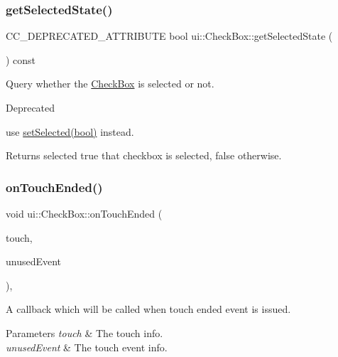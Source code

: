 \subsubsection{\texorpdfstring{get\+Selected\+State()}{getSelectedState()}\hspace{0.1cm}{\footnotesize\ttfamily [2/2]}}
{\footnotesize\ttfamily C\+C\+\_\+\+D\+E\+P\+R\+E\+C\+A\+T\+E\+D\+\_\+\+A\+T\+T\+R\+I\+B\+U\+TE bool ui\+::\+Check\+Box\+::get\+Selected\+State (\begin{DoxyParamCaption}{ }\end{DoxyParamCaption}) const\hspace{0.3cm}{\ttfamily [inline]}}

Query whether the \hyperlink{classui_1_1CheckBox}{Check\+Box} is selected or not.

\begin{DoxyRefDesc}{Deprecated}
\item[\hyperlink{deprecated__deprecated000373}{Deprecated}]use {\ttfamily \hyperlink{classui_1_1AbstractCheckButton_aca6eea451771dd184a1cd02984e77cc6}{set\+Selected(bool)}} instead. \end{DoxyRefDesc}
\begin{DoxyReturn}{Returns}
selected true that checkbox is selected, false otherwise. 
\end{DoxyReturn}
\mbox{\label{classui_1_1CheckBox_a95506c0d1b1bcab1b258ed62d4cc718a}} 
\subsubsection{\texorpdfstring{on\+Touch\+Ended()}{onTouchEnded()}\hspace{0.1cm}{\footnotesize\ttfamily [1/2]}}
{\footnotesize\ttfamily void ui\+::\+Check\+Box\+::on\+Touch\+Ended (\begin{DoxyParamCaption}\item[{\hyperlink{classTouch}{Touch} $\ast$}]{touch,  }\item[{\hyperlink{classEvent}{Event} $\ast$}]{unused\+Event }\end{DoxyParamCaption})\hspace{0.3cm}{\ttfamily [override]}, {\ttfamily [virtual]}}

A callback which will be called when touch ended event is issued. 
\begin{DoxyParams}{Parameters}
{\em touch} & The touch info. \\
\hline
{\em unused\+Event} & The touch event info. \\
\hline
\end{DoxyParams}


